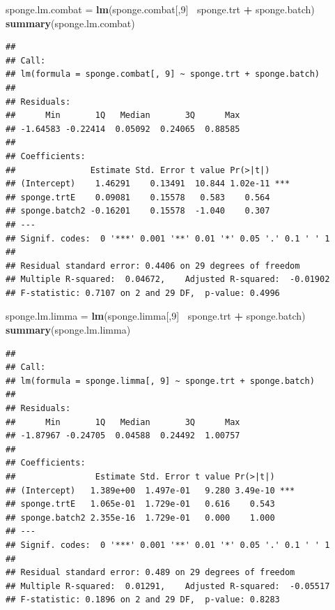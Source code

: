 \documentclass[]{book}
\newenvironment{Shaded}{\begin{snugshade}}{\end{snugshade}}
\newcommand{\KeywordTok}[1]{\textcolor[rgb]{0.13,0.29,0.53}{\textbf{#1}}}
\newcommand{\DecValTok}[1]{\textcolor[rgb]{0.00,0.00,0.81}{#1}}
\newcommand{\StringTok}[1]{\textcolor[rgb]{0.31,0.60,0.02}{#1}}
\newcommand{\OperatorTok}[1]{\textcolor[rgb]{0.81,0.36,0.00}{\textbf{#1}}}
\newcommand{\NormalTok}[1]{#1}
\begin{document}
\begin{Shaded}
\begin{Highlighting}[]
\NormalTok{sponge.lm.combat =}\StringTok{ }\KeywordTok{lm}\NormalTok{(sponge.combat[,}\DecValTok{9}\NormalTok{]}\OperatorTok{~}\StringTok{ }\NormalTok{sponge.trt }\OperatorTok{+}\StringTok{ }\NormalTok{sponge.batch)}
\KeywordTok{summary}\NormalTok{(sponge.lm.combat)}
\end{Highlighting}
\end{Shaded}

\begin{verbatim}
## 
## Call:
## lm(formula = sponge.combat[, 9] ~ sponge.trt + sponge.batch)
## 
## Residuals:
##      Min       1Q   Median       3Q      Max 
## -1.64583 -0.22414  0.05092  0.24065  0.88585 
## 
## Coefficients:
##               Estimate Std. Error t value Pr(>|t|)    
## (Intercept)    1.46291    0.13491  10.844 1.02e-11 ***
## sponge.trtE    0.09081    0.15578   0.583    0.564    
## sponge.batch2 -0.16201    0.15578  -1.040    0.307    
## ---
## Signif. codes:  0 '***' 0.001 '**' 0.01 '*' 0.05 '.' 0.1 ' ' 1
## 
## Residual standard error: 0.4406 on 29 degrees of freedom
## Multiple R-squared:  0.04672,    Adjusted R-squared:  -0.01902 
## F-statistic: 0.7107 on 2 and 29 DF,  p-value: 0.4996
\end{verbatim}

\begin{Shaded}
\begin{Highlighting}[]
\NormalTok{sponge.lm.limma =}\StringTok{ }\KeywordTok{lm}\NormalTok{(sponge.limma[,}\DecValTok{9}\NormalTok{]}\OperatorTok{~}\StringTok{ }\NormalTok{sponge.trt }\OperatorTok{+}\StringTok{ }\NormalTok{sponge.batch)}
\KeywordTok{summary}\NormalTok{(sponge.lm.limma)}
\end{Highlighting}
\end{Shaded}

\begin{verbatim}
## 
## Call:
## lm(formula = sponge.limma[, 9] ~ sponge.trt + sponge.batch)
## 
## Residuals:
##      Min       1Q   Median       3Q      Max 
## -1.87967 -0.24705  0.04588  0.24492  1.00757 
## 
## Coefficients:
##                Estimate Std. Error t value Pr(>|t|)    
## (Intercept)   1.389e+00  1.497e-01   9.280 3.49e-10 ***
## sponge.trtE   1.065e-01  1.729e-01   0.616    0.543    
## sponge.batch2 2.355e-16  1.729e-01   0.000    1.000    
## ---
## Signif. codes:  0 '***' 0.001 '**' 0.01 '*' 0.05 '.' 0.1 ' ' 1
## 
## Residual standard error: 0.489 on 29 degrees of freedom
## Multiple R-squared:  0.01291,    Adjusted R-squared:  -0.05517 
## F-statistic: 0.1896 on 2 and 29 DF,  p-value: 0.8283
\end{verbatim}
\end{document}
